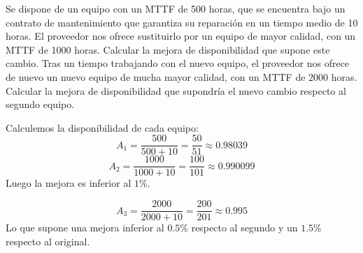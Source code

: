 \begin{problem}[1]
Se dispone de un equipo con un MTTF de 500 horas, que se encuentra bajo un contrato de mantenimiento que garantiza su reparación en un tiempo medio de 10 horas.
  \ppart El proveedor nos ofrece sustituirlo por un equipo de mayor calidad, con un MTTF de 1000 horas. Calcular la mejora de disponibilidad que supone este cambio.
  \ppart Tras un tiempo trabajando con el nuevo equipo, el proveedor nos ofrece de nuevo un nuevo equipo de mucha mayor calidad, con un MTTF de 2000 horas. Calcular la mejora de disponibilidad que supondría el nuevo cambio respecto al segundo equipo.

\solution

\spart
  Calculemos la disponibilidad de cada equipo:
  \[ A_1 = \frac{500}{500+10} = \frac{50}{51} \approx 0.98039 \]
  \[ A_2 = \frac{1000}{1000+10} = \frac{100}{101} \approx 0.990099 \]
  Luego la mejora es inferior al $1\%$.

\spart
  \[ A_3 = \frac{2000}{2000+10} = \frac{200}{201} \approx 0.995 \]
  Lo que supone una mejora inferior al $0.5\%$ respecto al segundo y un $1.5\%$ respecto al original.

\end{problem}

